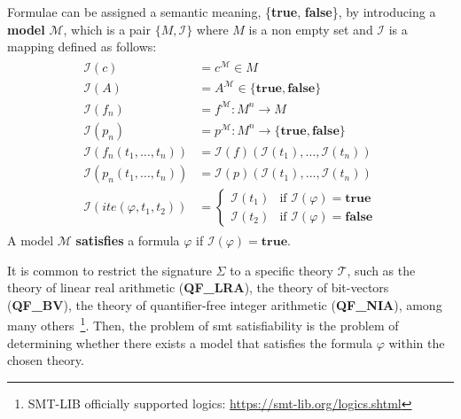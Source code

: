 \documentclass[runningheads]{llncs}
\begin{document}
Formulae can be assigned a semantic meaning, \{\textbf{true}, \textbf{false}\}, by introducing a \textbf{model} $\mathcal{M}$, which is a pair $\{M, \mathcal{I}\}$ where $M$ is a non empty set and $\mathcal{I}$ is a mapping defined as follows:
\begin{gather*}
    \begin{array}{ll}
        \mathcal{I}(c)                      & = c^\mathcal{M} \in M                                                 \\
        \mathcal{I}(A)                      & = A^\mathcal{M} \in \{\textbf{true}, \textbf{false}\}                 \\
        \mathcal{I}(f_n)                    & = f^{\mathcal{M}} : M^n \rightarrow M                                 \\
        \mathcal{I}(p_n)                    & = p^{\mathcal{M}} : M^n \rightarrow \{\textbf{true}, \textbf{false}\} \\
        \mathcal{I}(f_n(t_1, \dots, t_n))   & = \mathcal{I}(f)(\mathcal{I}(t_1), \dots, \mathcal{I}(t_n))           \\
        \mathcal{I}(p_n(t_1, \dots, t_n))   & = \mathcal{I}(p)(\mathcal{I}(t_1), \dots, \mathcal{I}(t_n))           \\
        \mathcal{I}(ite(\varphi, t_1, t_2)) & = \begin{cases}
                                                    \mathcal{I}(t_1) & \text{if } \mathcal{I}(\varphi) = \textbf{true}  \\
                                                    \mathcal{I}(t_2) & \text{if } \mathcal{I}(\varphi) = \textbf{false}
                                                \end{cases}
    \end{array}
\end{gather*}
A model $\mathcal{M}$ \textbf{satisfies} a formula $\varphi$ if $\mathcal{I}(\varphi) = \textbf{true}$.

It is common to restrict the signature $\Sigma$ to a specific theory $\mathcal{T}$, such as the theory of linear real arithmetic (\textbf{QF\_LRA}), the theory of bit-vectors (\textbf{QF\_BV}), the theory of quantifier-free integer arithmetic (\textbf{QF\_NIA}), among many others~\footnote{SMT-LIB officially supported logics: \url{https://smt-lib.org/logics.shtml}}.
Then, the problem of \gls{smt} satisfiability is the problem of determining whether there exists a model that satisfies the formula $\varphi$ within the chosen theory.
\end{document}
